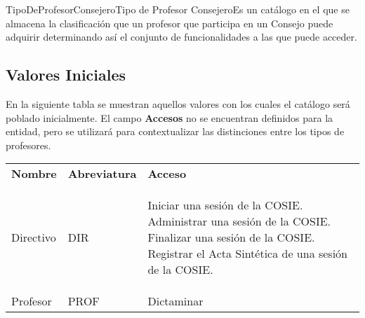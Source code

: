 	\begin{TipoDeDato}{TipoDeProfesorConsejero}{Tipo de Profesor Consejero}{Es un catálogo en el que se almacena la clasificación que un profesor que participa en un Consejo puede adquirir determinando así el conjunto de
 funcionalidades a las que puede acceder. }
	\begin{tdAtributos}
	\end{tdAtributos}
	
	\subsection{Valores Iniciales}
  En la siguiente tabla se muestran aquellos valores con los cuales el catálogo será poblado inicialmente. El campo \textbf{Accesos} no se encuentran definidos para la entidad, pero se utilizará para contextualizar las distinciones entre los tipos de profesores. \cdtEmpty
	\begin{longtable}{| p{}| p{}| p{}|}
	 			\rowcolor{colorPrincipal}
	 			\multicolumn{3}{|c|}{\bf \color{white} Valores Iniciales}\\
	 			\hline
	 			\rowcolor{colorSecundario}
	 			\bf \color{white} Nombre & \bf \color{white} Abreviatura & \bf\color{white}Acceso\\
	 			\hline
	 			Directivo & DIR & \begin{Titemize}
	 				\Titem Iniciar una sesión de la COSIE.
	 				\Titem Administrar una sesión de la COSIE.
	 				\Titem Finalizar una sesión de la COSIE.
	 				\Titem Registrar el Acta Sintética de una sesión de la COSIE.
	 			\end{Titemize}\\
	 			\hline
	 			Profesor & PROF & Dictaminar\\
	 			\hline
	 		\end{longtable}
	\end{TipoDeDato}

